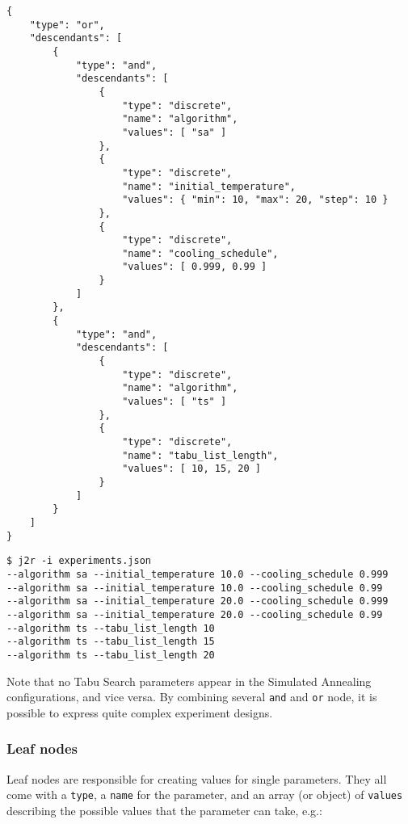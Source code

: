 \documentclass[11pt,notitlepage,twoside,a4paper]{article}
\begin{document}
\begin{scriptsize}
\begin{lstlisting}
{
    "type": "or",
    "descendants": [
        {
            "type": "and",
            "descendants": [
                { 
                    "type": "discrete", 
                    "name": "algorithm", 
                    "values": [ "sa" ]
                },
                { 
                    "type": "discrete", 
                    "name": "initial_temperature", 
                    "values": { "min": 10, "max": 20, "step": 10 }
                },
                {
                    "type": "discrete",
                    "name": "cooling_schedule",
                    "values": [ 0.999, 0.99 ]
                }
            ]
        },
        {
            "type": "and",
            "descendants": [
                { 
                    "type": "discrete", 
                    "name": "algorithm", 
                    "values": [ "ts" ]
                },
                { 
                    "type": "discrete", 
                    "name": "tabu_list_length", 
                    "values": [ 10, 15, 20 ]
                }
            ]
        }
    ]
}
\end{lstlisting}

\begin{lstlisting}
$ j2r -i experiments.json
--algorithm sa --initial_temperature 10.0 --cooling_schedule 0.999
--algorithm sa --initial_temperature 10.0 --cooling_schedule 0.99
--algorithm sa --initial_temperature 20.0 --cooling_schedule 0.999
--algorithm sa --initial_temperature 20.0 --cooling_schedule 0.99
--algorithm ts --tabu_list_length 10
--algorithm ts --tabu_list_length 15
--algorithm ts --tabu_list_length 20
\end{lstlisting}
\end{scriptsize}

Note that no Tabu Search parameters appear in the Simulated Annealing
configurations, and vice versa. By combining several \texttt{and} and
\texttt{or} node, it is possible to express quite complex experiment
designs.

\subsubsection{Leaf nodes}

Leaf nodes are responsible for creating values for single parameters.
They all come with a \texttt{type}, a \texttt{name} for the parameter,
and an array (or object) of \texttt{values} describing the possible
values that the parameter can take, e.g.:
\end{document}
